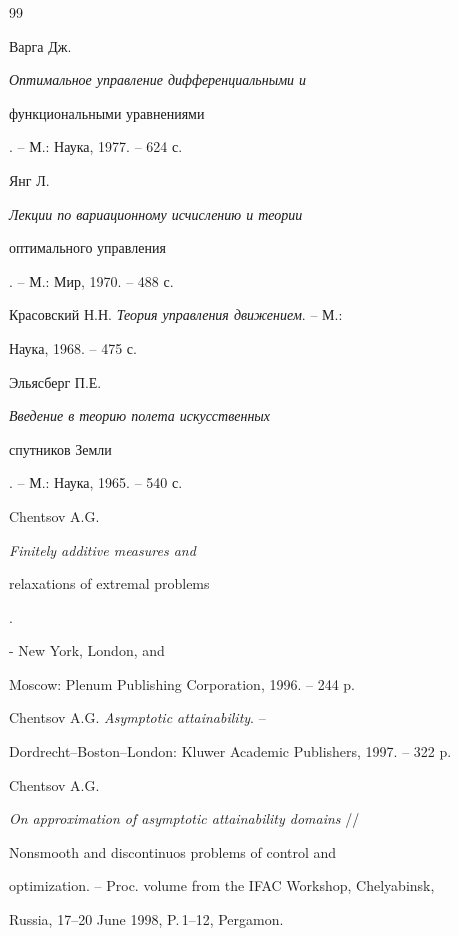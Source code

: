 \begin{thebibliography}{99}





 Варга Дж. {\em Оптимальное управление дифференциальными и


функциональными уравнениями}. -- М.: Наука, 1977. -- 624 с.





 Янг Л. {\em Лекции по вариационному исчислению и теории


оптимального управления}. -- М.: Мир, 1970. -- 488 с.





 Красовский Н.Н. {\em Теория управления движением}. -- М.:


Наука, 1968. -- 475 с.





 Эльясберг П.Е. {\em Введение в теорию полета искусственных


спутников Земли}. -- М.: Наука, 1965. -- 540 с.





 Chentsov A.G. {\em Finitely additive measures and


relaxations of extremal problems}.


- New York, London, and


Moscow: Plenum Publishing Corporation, 1996. -- 244 p.





 Chentsov A.G. {\em Asymptotic attainability}. --


Dordrecht--Boston--London: Kluwer Academic Publishers, 1997. -- 322 p.







Chentsov A.G.


{\em On approximation of asymptotic attainability domains} //


Nonsmooth and discontinuos problems of control and


optimization. -- Proc. volume from the IFAC Workshop, Chelyabinsk,


Russia, 17--20 June 1998, P.\,1--12, Pergamon.






\end{thebibliography}
